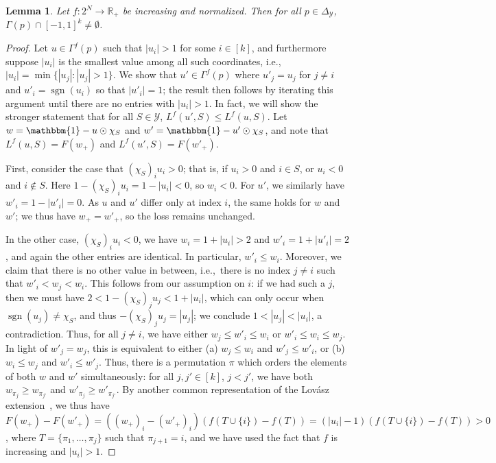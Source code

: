 \documentclass[11pt]{article}
\newcommand{\Comments}{1}
\newcommand{\mytodo}[2]{\ifnum\Comments=1%
  \todo[linecolor=#1!80!black,backgroundcolor=#1,bordercolor=#1!80!black]{#2}\fi}
\newcommand{\jessiet}[1]{\mytodo{teal!20!white}{JF: #1}}
\newcommand{\reals}{\mathbb{R}}
\newcommand{\simplex}{\Delta_\Y}
\newcommand{\Y}{\mathcal{Y}}
\newcommand{\ones}{\mathbbm{1}}
\DeclareMathOperator*{\sgn}{sgn}
\newtheorem{lemma}{Lemma}
\begin{document}
\begin{lemma}
	\label{lem:lovasz-cube}
	Let $f:2^N\to\reals_+$ be increasing and normalized.
	Then for all $p\in\simplex$, $\Gamma(p) \cap [-1,1]^k \neq \emptyset$.
\end{lemma}
\begin{proof}
	Let $u\in\Gamma^f(p)$ such that $|u_i|>1$ for some $i\in [k]$, and furthermore suppose $|u_i|$ is the smallest value among all such coordinates, i.e., $|u_i| = \min\{|u_j| : |u_j| > 1\}$.
	We show that $u'\in\Gamma^f(p)$ where $u'_j = u_j$ for $j\neq i$ and $u'_i = \sgn(u_i)$ so that $|u'_i|=1$; the result then follows by iterating this argument until there are no entries with $|u_i|>1$.
	In fact, we will show the stronger statement that for all $S\in\Y$, $L^f(u',S) \leq L^f(u,S)$.
	Let $w = \ones - u\odot \chi_S$ and $w' = \ones - u'\odot \chi_S$, and note that $L^f(u,S) = F(w_+)$ and $L^f(u',S) = F(w'_+)$.
	
	First, consider the case that $(\chi_S)_iu_i > 0$; that is, if $u_i > 0$ and $i\in S$, or $u_i < 0$ and $i\notin S$.
	Here $1-(\chi_S)_iu_i = 1-|u_i| < 0$, so $w_i < 0$.
	For $u'$, we similarly have $w'_i = 1-|u'_i| = 0$.
	As $u$ and $u'$ differ only at index $i$, the same holds for $w$ and $w'$; we thus have $w_+ = w'_+$, so the loss remains unchanged.
	
	In the other case, $(\chi_S)_iu_i < 0$, we have $w_i = 1+|u_i| > 2$ and $w'_i = 1+|u'_i| = 2$, and again the other entries are identical.
	In particular, $w'_i \leq w_i$.
	Moreover, we claim that there is no other value in between, i.e.,\ there is no index $j\neq i$ such that $w'_i < w_j < w_i$.
	This follows from our assumption on $i$: if we had such a $j$, then we must have $2 < 1 - (\chi_S)_ju_j < 1 + |u_i|$, which can only occur when $\sgn(u_j) \neq \chi_S$, and thus $-(\chi_S)_ju_j = |u_j|$; we conclude $1 < |u_j| < |u_i|$, a contradiction.
	Thus, for all $j\neq i$, we have either $w_j \leq w'_i \leq w_i$ or $w'_i \leq w_i \leq w_j$.
	In light of $w'_j = w_j$, this is equivalent to either (a) $w_j \leq w_i$ and $w'_j \leq w'_i$, or (b) $w_i \leq w_j$ and $w'_i \leq w'_j$.
	Thus, there is a permutation $\pi$ which orders the elements of both $w$ and $w'$ simultaneously: for all $j,j'\in [k]$, $j<j'$, we have both $w_{\pi_j} \geq w_{\pi_{j'}}$ and $w'_{\pi_j} \geq w'_{\pi_{j'}}$.
	By another common representation of the Lov\'asz extension~\cite[Equation 3.1]{bach2013learning}, we thus have $F(w_+) - F(w'_+) = ((w_+)_i - (w'_+)_i)(f(T\cup\{i\})-f(T)) = (|u_i|-1)(f(T\cup\{i\})-f(T)) > 0$,
	where $T = \{\pi_1,\ldots,\pi_j\}$ such that $\pi_{j+1} = i$, and we have used the fact that $f$ is increasing and $|u_i|>1$.
\end{proof}
\end{document}
